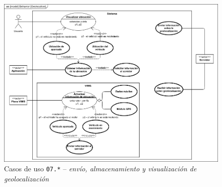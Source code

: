 \begin{figure}[H]
  \centering
  \includegraphics[width=\linewidth]{diagrams/UseCases-UC7 - location.png}
  \caption{Casos de uso \texttt{07.*} -- \textit{envío, almacenamiento y visualización de geolocalización}}
  \label{uc:location}
\end{figure}

